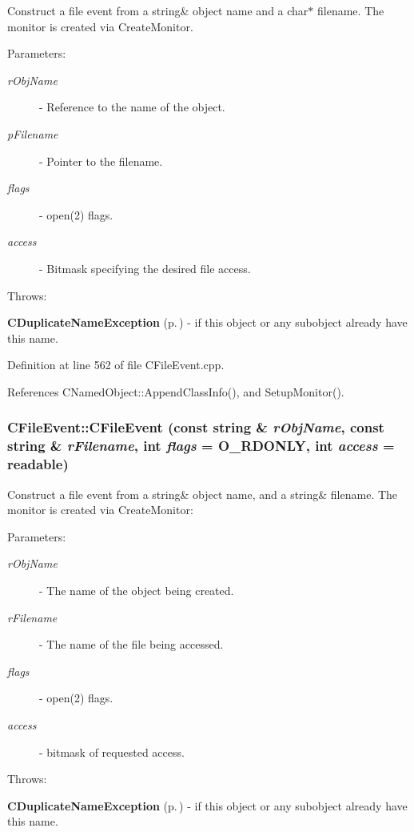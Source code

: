 Construct a file event from a string\& object name and a char$\ast$ filename. The monitor is created via Create\-Monitor. \begin{Desc}
\item[Parameters: ]\par
\begin{description}
\item[{\em 
r\-Obj\-Name}]- Reference to the name of the object. \item[{\em 
p\-Filename}]- Pointer to the filename. \item[{\em 
flags}]- open(2) flags. \item[{\em 
access}]- Bitmask specifying the desired file access.\end{description}
\end{Desc}
Throws:\begin{CompactItemize}
\item 
{\bf CDuplicate\-Name\-Exception} {\rm (p.\,\pageref{classCDuplicateNameException})} - if this object or any subobject already have this name. \end{CompactItemize}


Definition at line 562 of file CFile\-Event.cpp.

References CNamed\-Object::Append\-Class\-Info(), and Setup\-Monitor().
\subsubsection{\setlength{\rightskip}{0pt plus 5cm}CFile\-Event::CFile\-Event (const string \& {\em r\-Obj\-Name}, const string \& {\em r\-Filename}, int {\em flags} = O\_\-RDONLY, int {\em access} = {\bf readable})}\label{classCFileEvent_a8}


Construct a file event from a string\& object name, and a string\& filename. The monitor is created via Create\-Monitor: \begin{Desc}
\item[Parameters: ]\par
\begin{description}
\item[{\em 
r\-Obj\-Name}]- The name of the object being created. \item[{\em 
r\-Filename}]- The name of the file being accessed. \item[{\em 
flags}]- open(2) flags. \item[{\em 
access}]- bitmask of requested access.\end{description}
\end{Desc}
Throws:\begin{CompactItemize}
\item 
{\bf CDuplicate\-Name\-Exception} {\rm (p.\,\pageref{classCDuplicateNameException})} - if this object or any subobject already have this name. \end{CompactItemize}


